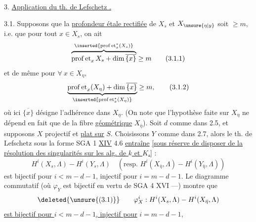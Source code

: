 3. \uline{Application du th. de Lefschetz   .}

 3.1. Supposons que la \uline{profondeur étale rectifiée}  de $X_s$ et $X_{\unsure{\eta|y}}$ soit $\geq m$, i.e. que pour tout $x\in X_s$, on ait
\[
\overbrace{\operatorname{prof\,et}_x X_s+\dim\overline{\{x\}}}^{\inserted{\operatorname{prof\,et}_x^{*}(X_s)}}\geq m
\tag*{(3.1.1)}
\]
et de même pour $\forall\ x\in X_\eta$,
\[
\underbrace{\operatorname{prof\,et}_x(X_\eta)+\dim\overline{\{x\}}}_{\inserted{\operatorname{prof\,et}_x^{*}(X_\eta)}}\geq m,
\tag*{(3.1.2)}
\]
où ici $\overline{\{x\}}$ désigne l'adhérence dans $X_\eta$. (On note que l'hypothèse faite sur $X_\eta$ ne dépend en fait que de la fibre \uline{géométrique} $X_{\bar\eta}$).
 Soit $d$ comme dans 2.5, et supposons  $X$ projectif et \uline{plat sur} $S$.
Choisissons $Y$ comme dans 2.7, alors le th. de Lefschetz   sous la forme SGA 1 \uline{XIV} 4.6 \uline{entraîne} \uline{[sous réserve de disposer de la résolution des singularités sur  les  alg. de $k$ et $K$.]} :
\[
H^i(X_s,\Lambda)\mathbin{-}H^i(Y_s,\Lambda)
\quad(\text{resp. }H^i(X_{\bar\eta},\Lambda)\mathbin{-}H^i(Y_{\bar\eta},\Lambda))
\]
est bijectif pour $i<m-d-1$, injectif pour $i=m-d-1$. Le diagramme commutatif
(où $\varphi_Y$ est bijectif en vertu de SGA 4 XVI ---) montre que 
\[
\deleted{\unsure{\text{(3.1)}}}\qquad\varphi_X^i:H^i(X_s,\Lambda)\mathbin{-}H^i(X_{\bar\eta},\Lambda)
\]
\uline{est bijectif pour $i<m-d-1$, injectif pour} $i=m-d-1$,
